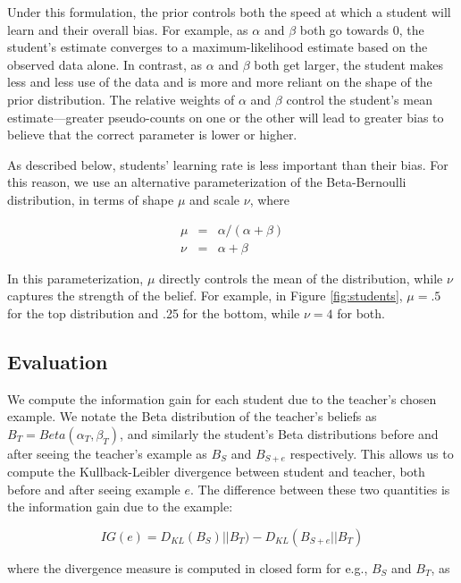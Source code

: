 \documentclass[10pt,letterpaper]{article}
\begin{document}
Under this formulation, the prior controls both the speed at which a student will learn and their overall bias. For example, as $\alpha$ and $\beta$ both go towards 0, the student's estimate converges to a maximum-likelihood estimate based on the observed data alone. In contrast, as $\alpha$ and $\beta$ both get larger, the student makes less and less use of the data and is more and more reliant on the shape of the prior distribution. The relative weights of $\alpha$ and $\beta$ control the student's mean estimate---greater pseudo-counts on one or the other will lead to greater bias to believe that the correct parameter is lower or higher. 

As described below, students' learning rate is less important than their bias. For this reason, we use an alternative parameterization of the Beta-Bernoulli distribution, in terms of shape $\mu$ and scale $\nu$, where

\begin{eqnarray}
\mu &=&  \alpha / (\alpha + \beta) \\
\nu &=& \alpha + \beta
\end{eqnarray}

\noindent In this parameterization, $\mu$ directly controls the mean of the distribution, while $\nu$ captures the strength of the belief. For example, in Figure \ref{fig:students}, $\mu=.5$ for the top distribution and .25 for the bottom, while $\nu=4$ for both.

\subsection{Evaluation}

We compute the information gain for each student due to the teacher's chosen example. We notate the Beta distribution of the teacher's beliefs as $B_T = Beta(\alpha_T,\beta_T)$, and similarly the student's Beta distributions before and after seeing the teacher's example as $B_{S}$ and $B_{S+e}$ respectively. This allows us to compute the Kullback-Leibler divergence \cite{cover2012} between student and teacher, both before and after seeing example $e$. The difference between these two quantities is the information gain due to the example:

\begin{equation}
\label{eq:ig}
IG(e) = D_{KL} ( B_{S})||B_T )  - D_{KL} ( B_{S+e} ||B_T ) 
\end{equation}

\noindent where the divergence measure is computed in closed form for e.g., $B_S$ and $B_T$, as
\end{document}
